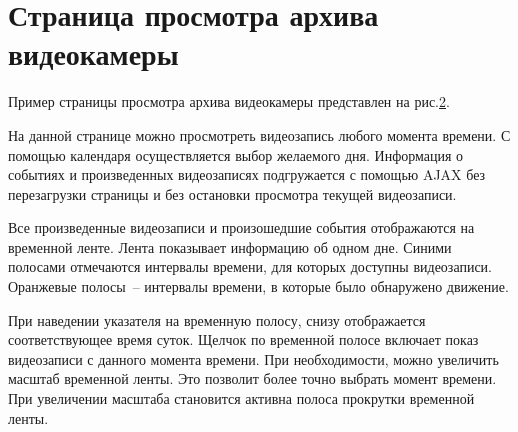 \begin{figure}[!htb]
\def\svgwidth{\columnwidth}
\caption{}
\label{ui_2}
\end{figure}

\section{Страница просмотра архива видеокамеры}
Пример страницы просмотра архива видеокамеры представлен на рис.\ref{ui_3}.

На данной странице можно просмотреть видеозапись любого момента времени.
С помощью календаря осуществляется выбор желаемого дня. Информация о событиях и произведенных
видеозаписях подгружается с помощью AJAX без перезагрузки страницы и без остановки просмотра
текущей видеозаписи.

Все произведенные видеозаписи и произошедшие события отображаются на временной ленте.
Лента показывает информацию об одном дне. Синими полосами отмечаются интервалы времени,
для которых доступны видеозаписи. Оранжевые полосы~-- интервалы времени, в которые было обнаружено
движение.

При наведении указателя на временную полосу, снизу отображается соответствующее время суток.
Щелчок по временной полосе включает показ видеозаписи с данного момента времени.
При необходимости, можно увеличить масштаб временной ленты.
Это позволит более точно выбрать момент времени.
При увеличении масштаба становится активна полоса прокрутки временной ленты.

\begin{figure}[!htb]
\def\svgwidth{\columnwidth}
\caption{}
\label{ui_3}
\end{figure}
